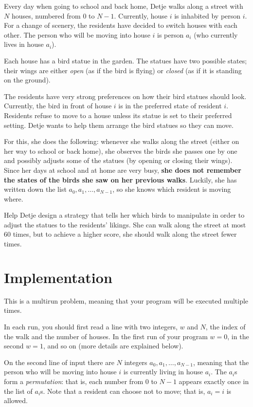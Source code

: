 
Every day when going to school and back home, Detje walks along a street with $N$ houses, numbered from $0$ to $N-1$.
Currently, house $i$ is inhabited by person $i$.
For a change of scenery, the residents have decided to switch houses with each other.
The person who will be moving into house $i$ is person $a_i$ (who currently lives in house $a_i$).

Each house has a bird statue in the garden.
The statues have two possible states; their wings are either \textit{open} (as if the bird is flying) or \textit{closed} (as if it is standing on the ground).

The residents have very strong preferences on how their bird statues should look.
Currently, the bird in front of house $i$ is in the preferred state of resident $i$.
Residents refuse to move to a house unless its statue is set to their preferred setting.
Detje wants to help them arrange the bird statues so they can move.

For this, she does the following: whenever she walks along the street (either on her way to school or back home),
she observes the birds she passes one by one and possibly adjusts some of the statues (by opening or closing their wings).
Since her days at school and at home are very busy, \textbf{she does not remember the states of the birds she saw on her previous walks}.
Luckily, she has written down the list $a_0, a_1, \ldots, a_{N-1}$, so she knows which resident is moving where.

Help Detje design a strategy that tells her which birds to manipulate in order to adjust the statues to the residents' likings.
She can walk along the street at most $60$ times, but to achieve a higher score, she should walk along the street fewer times.

\section*{Implementation}
This is a multirun problem, meaning that your program will be executed multiple times.

In each run, you should first read a line with two integers, $w$ and $N$, the index of the walk and the number of houses.
In the first run of your program $w = 0$, in the second $w = 1$, and so on (more details are explained below).

On the second line of input there are $N$ integers $a_0,a_1,\ldots,a_{N-1}$, meaning that
the person who will be moving into house $i$ is currently living in house $a_i$.
The $a_i$s form a \textit{permutation}: that is, each number from $0$ to $N-1$ appears exactly once in the list of $a_i$s.
Note that a resident can choose not to move; that is, $a_i = i$ is allowed.

